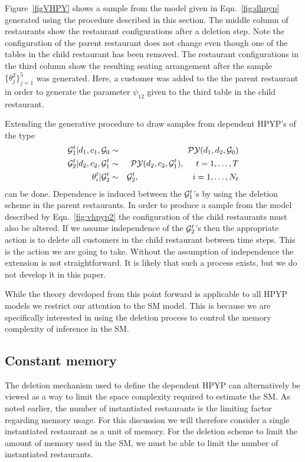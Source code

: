 Figure~\ref{figVHPY} shows a sample from the model given in Eqn.~\ref{fig:dhpyp} generated using the procedure described in this section. The middle column of restaurants show the restaurant configurations after a deletion step.  Note the configuration of the parent restaurant does not change even though one of the tables in the child restaurant has been removed.  The restaurant configurations in the third column show the resulting seating arrangement after the sample $\{ \theta_j^2 \}_{j = 1}^5$ was generated.  Here, a customer was added to the the parent restaurant in order to generate the parameter $\psi_{12}$  given to the third table in the child restaurant.

Extending the generative procedure to draw samples from dependent HPYP's of the type
%
\begin{eqnarray}
\G_1^t | d_1, c_1, \G_0  &\sim& \PY(d_1,d_2,\G_0)  \label{fig:vhpyp2}\\
\G_2^t | d_2, c_2, \G_1^t &\sim& \PY(d_2, c_2, \G_1^t),  \hspace{.5cm} t = 1,\dots, T \nonumber \\
\theta^t_i | \G_2^t &\sim& \G_2^t, \hspace{2.28cm} i = 1, \dots, N_t \nonumber
\end{eqnarray}
%
can be done. Dependence is induced between the $\G_1^t$'s by using the deletion scheme in the parent restaurants.  In order to produce a sample from the model described by Eqn.~\ref{fig:vhpyp2} the configuration of the child restaurants must also be altered.  If we assume independence of the $\G_2^t$'s then the appropriate action is to delete all customers in the child restaurant between time steps. This is the action we are going to take. Without the assumption of independence the extension is not straightforward. It is likely that such a process exists, but we do not develop it in this paper.

While the theory developed from this point forward is applicable to all HPYP models we restrict our attention to the SM model.  This is because we are specifically interested in using the deletion process to control the memory complexity of inference in the SM.

\subsection{Constant memory}
The deletion mechanism used to define the dependent HPYP can alternatively be viewed as a way to limit the space complexity required to estimate the SM.  As noted earlier, the number of instantiated restaurants is the limiting factor regarding memory usage.  For this discussion we will therefore consider a single instantiated restaurant as a unit of memory. For the deletion scheme to limit the amount of memory used in the SM, we must be able to limit the number of instantiated restaurants.

